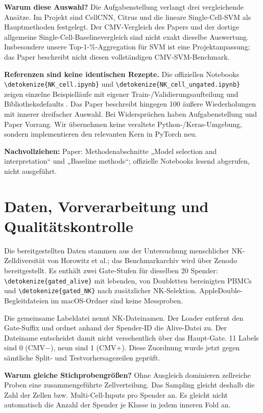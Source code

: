 \documentclass[11pt,a4paper]{article}
\newcommand{\code}[1]{\expandafter\nolinkurl\expandafter{\detokenize{#1}}}
\newcommand{\source}[1]{\par{\footnotesize\raggedright\color{muted}\textbf{Nachvollziehen:} #1\par}}
\newcommand{\tab}[4]{\begin{table}[!ht]\centering\caption{#2}\label{#3}{\small}#4\end{table}}
\begin{document}
\textbf{Warum diese Auswahl?} Die Aufgabenstellung verlangt drei vergleichende
Ansätze. Im Projekt sind CellCNN, Citrus und die lineare Single-Cell-SVM
als Hauptmethoden festgelegt. Der CMV-Vergleich des Papers und der dortige
allgemeine Single-Cell-Baselinevergleich sind nicht exakt dieselbe Auswertung.
Insbesondere unsere Top-1-\%-Aggregation für SVM ist eine Projektanpassung;
das Paper beschreibt nicht diesen vollständigen CMV-SVM-Benchmark.

\textbf{Referenzen sind keine identischen Rezepte.} Die offiziellen
Notebooks \code{NK_cell.ipynb} und \code{NK_cell_ungated.ipynb} zeigen einzelne
Beispielläufe mit eigener Train-/Validierungsaufteilung und Bibliotheksdefaults
\cite{cellcnncode}. Das Paper beschreibt hingegen 100 äußere Wiederholungen
mit innerer dreifacher Auswahl. Bei Widersprüchen haben Aufgabenstellung und
Paper Vorrang. Wir übernehmen keine veraltete Python-/Keras-Umgebung, sondern
implementieren den relevanten Kern in PyTorch neu.
\source{Paper: Methodenabschnitte „Model selection and interpretation“ und
„Baseline methods“; offizielle Notebooks lesend abgerufen, nicht ausgeführt.}

\clearpage
\section{Daten, Vorverarbeitung und Qualitätskontrolle}\label{sec:daten}
Die bereitgestellten Daten stammen aus der Untersuchung menschlicher
NK-Zelldiversität von Horowitz et al.\cite{horowitz}; das Benchmarkarchiv
wird über Zenodo bereitgestellt\cite{dataset}. Es enthält zwei Gate-Stufen
für dieselben 20 Spender: \code{gated_alive} mit lebenden, von Doubletten
bereinigten PBMCs und \code{gated_NK} nach zusätzlicher NK-Selektion.
AppleDouble-Begleitdateien im macOS-Ordner sind keine Messproben.

Die gemeinsame Labeldatei nennt NK-Dateinamen. Der Loader entfernt den
Gate-Suffix und ordnet anhand der Spender-ID die Alive-Datei zu. Der
Dateiname entscheidet damit nicht versehentlich über das Haupt-Gate.
11 Labels sind 0 (CMV−), neun sind 1 (CMV+). Diese Zuordnung wurde jetzt
gegen sämtliche Split- und Testvorhersagezeilen geprüft.
\tab{spender}{Vollständiges Spenderinventar. Zellzahlen jetzt gegen die FCS-Dateien
geprüft. „Testmodelle“ zählt äußere Testauftritte je Methode über 100 Splits.}{tab:spender}{}

\textbf{Warum gleiche Stichprobengrößen?} Ohne Ausgleich dominieren zellreiche
Proben eine zusammengeführte Zellverteilung. Das Sampling gleicht deshalb
die Zahl der Zellen bzw. Multi-Cell-Inputs pro Spender an. Es gleicht nicht
automatisch die Anzahl der Spender je Klasse in jedem inneren Fold an.
\end{document}
